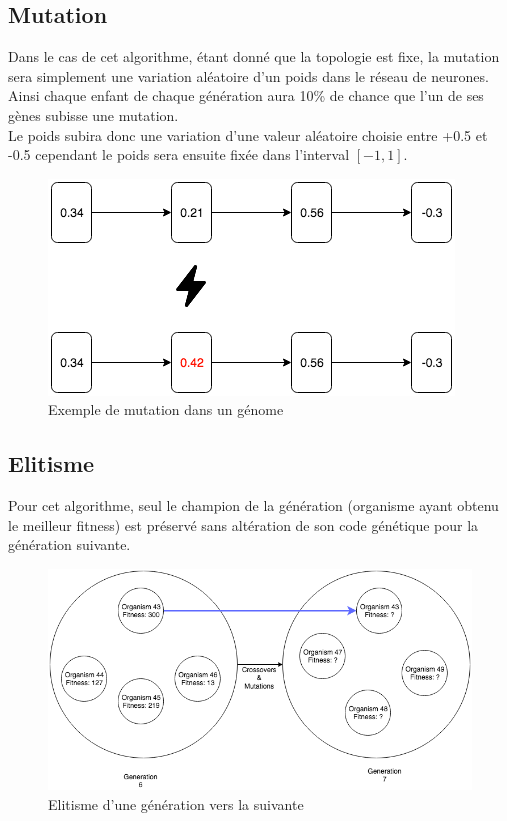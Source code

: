\documentclass{article}
\begin{document}
\subsection{Mutation}

Dans le cas de cet algorithme, étant donné que la topologie est fixe, la mutation sera simplement une variation aléatoire d'un poids dans le réseau de neurones. Ainsi chaque enfant de chaque génération aura 10\% de chance que l'un de ses gènes subisse une mutation.\\
Le poids subira donc une variation d'une valeur aléatoire choisie entre +0.5 et -0.5 cependant le poids sera ensuite fixée dans l'interval $[-1, 1]$.

\begin{figure}[h]
\begin{center}
	\includegraphics[scale=0.6]{mutation.png}
	\caption{Exemple de mutation dans un génome}
\end{center}
\end{figure}
\newpage

\subsection{Elitisme}

Pour cet algorithme, seul le champion de la génération (organisme ayant obtenu le meilleur fitness) est préservé sans altération de son code génétique pour la génération suivante.

\begin{figure}[h]
\begin{center}
	\includegraphics[scale=0.5]{elitism.png}
	\caption{Elitisme d'une génération vers la suivante}
\end{center}
\end{figure}
\end{document}
